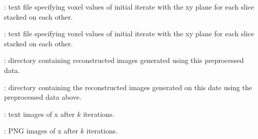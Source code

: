 \begin{tcbfunctionenv}
\begin{tcbparagraph}
\begin{deepList}[labelindent=1pt, leftmargin=*]
\begin{deepList}[labelindent=1pt, leftmargin=*]
\begin{deepList}[labelindent=1pt, leftmargin=*]
\begin{deepList}[labelindent=1pt, leftmargin=*]
\begin{deepList}[labelindent=1pt, leftmargin=*]
\begin{deepList}[labelindent=1pt, leftmargin=*]
\begin{deepList}[labelindent=1pt, leftmargin=*]
\begin{deepList}[labelindent=1pt, leftmargin=*]
\begin{deepList}[labelindent=1pt, leftmargin=*]
                                        \item {} : text file specifying voxel values of initial iterate with the xy plane for each slice stacked on each other.
                                        \item {} : text file specifying voxel values of initial iterate with the xy plane for each slice stacked on each other.
                                        \item {} : directory containing reconstructed images generated using this preprocessed data.
                                        \begin{deepList}[labelindent=1pt, leftmargin=*]
                                            \item {} : directory containing the reconstructed images generated on this date using the preprocessed data above.
                                                \begin{deepList}[labelindent=1pt, leftmargin=*]
                                                    \item {} : text images of x after $k$ iterations.
                                                    \item {} : PNG images of x after $k$ iterations.
                                                \end{deepList}%
                                        \end{deepList}%
                                    \end{deepList}%
                                \end{deepList}%
                            \end{deepList}%
                        \end{deepList}%

\end{deepList}
\end{deepList}
\end{deepList}
\end{deepList}
\end{deepList}
\end{tcbparagraph}
\end{tcbfunctionenv}
